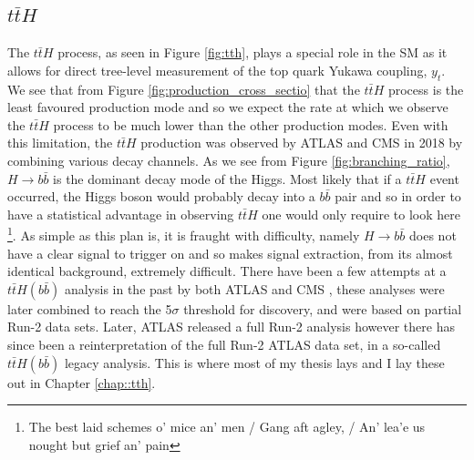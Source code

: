 \subsection{$t\bar{t}H$}
The $t\bar{t}H$ process, as seen in Figure \ref{fig:tth}, plays a special role in the SM as it allows for direct tree-level measurement of the top quark Yukawa coupling, $y_t$. We see that from Figure \ref{fig:production_cross_sectio} that the $t\bar{t}H$ process is the least favoured production mode and so we expect the rate at which we observe the $t\bar{t}H$ process to be much lower than the other production modes. Even with this limitation, the $t\bar{t}H$ production was observed by ATLAS \cite{tth-atlas-2018} and CMS \cite{tth-cms-2018} in 2018 by combining various decay channels. As we see from Figure \ref{fig:branching_ratio}, $H \rightarrow b\bar{b}$ is the dominant decay mode of the Higgs. Most likely that if a $t\bar{t}H$ event occurred, the Higgs boson would probably decay into a $b\bar{b}$ pair and so in order to have a statistical advantage in observing $t\bar{t}H$ one would only require to look here \footnote{The best laid schemes o' mice an' men / Gang aft agley, / An' lea'e us nought but grief an' pain}. As simple as this plan is, it is fraught with difficulty, namely $H\rightarrow b\bar{b}$ does not have a clear signal to trigger on and so makes signal extraction, from its almost identical background, extremely difficult. There have been a few attempts at a $t\bar{t}H(b\bar{b})$ analysis in the past by both ATLAS \cite{tth-atlas-2018} and CMS \cite{tth-cms-2019}, these analyses were later combined to reach the 5$\sigma$ threshold for discovery, and were based on partial Run-2 data sets. Later, ATLAS released a full Run-2 analysis \cite{ATLAS:2022tthbb} however there has since been a reinterpretation of the full Run-2 ATLAS data set, in a so-called $t\bar{t}H(b\bar{b})$ legacy analysis. This is where most of my thesis lays and I lay these out in Chapter  \ref{chap::tth}.
